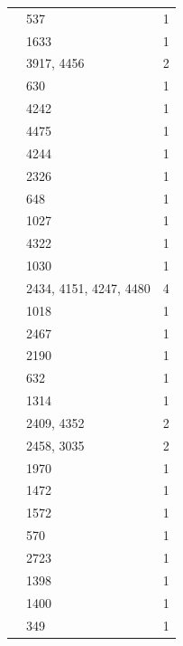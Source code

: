 \begin{longtable}{@{}p{}p{}p{}@{}}
\cite[(1.1)--(1.2)]{GeckHiss1991} & 537 & 1 \\
\cite[Theorem~5.1]{GeckHiss1991} & 1633 & 1 \\
\cite[Section~3(A)]{GeckMalle2000} & 3917, 4456 & 2 \\
\cite[Section~3(B), p.~443]{GeckMalle2000} & 630 & 1 \\
\cite[Section~3(C)]{GeckMalle2000} & 4242 & 1 \\
\cite[Section~3(C) and Theorem~3.7]{GeckMalle2000} & 4475 & 1 \\
\cite[Theorem~3.7]{GeckMalle2000} & 4244 & 1 \\
\cite[4.1.1]{GeckMalle2020} & 2326 & 1 \\
\cite[Definition~4.1.17]{GeckMalle2020} & 648 & 1 \\
\cite[Example~2.7.18]{GeckMalle2020} & 1027 & 1 \\
\cite[Lemma~1.5.22]{GeckMalle2020} & 4322 & 1 \\
\cite[Proposition~2.6.16]{GeckMalle2020} & 1030 & 1 \\
\cite[Proposition~3.4.21]{GeckMalle2020} & 2434, 4151, 4247, 4480 & 4 \\
\cite[Proposition~3.4.3]{GeckMalle2020} & 1018 & 1 \\
\cite[Proposition~3.4.3 and Corollary~3.4.5]{GeckMalle2020} & 2467 & 1 \\
\cite[Remark~1.5.12]{GeckMalle2020} & 2190 & 1 \\
\cite[Remark~2.3.28]{GeckMalle2020} & 632 & 1 \\
\cite[Remark~4.2.1]{GeckMalle2020} & 1314 & 1 \\
\cite[Remark~4.2.17]{GeckMalle2020} & 2409, 4352 & 2 \\
\cite[Theorem~1.7.15]{GeckMalle2020} & 2458, 3035 & 2 \\
\cite[Theorem~4.7.1(3)]{GeckMalle2020} & 1970 & 1 \\
\cite[Theorem~8.2]{GruberHiss1997} & 1472 & 1 \\
\cite[Theorem~8.2 and Corollary~8.7]{GruberHiss1997} & 1572 & 1 \\
\cite[Corollary~11.22]{Isaacs1976} & 570 & 1 \\
\cite[Theorem~1.1]{KessarMalle2013} & 2723 & 1 \\
\cite[Definition~2.1 and Remark~2.2]{KessarMalle2015} & 1398 & 1 \\
\cite[Theorem~A(e)]{KessarMalle2015} & 1400 & 1 \\
\cite[Definition~3.2]{KoshitaniSpath2016} & 349 & 1 \\

\end{longtable}
